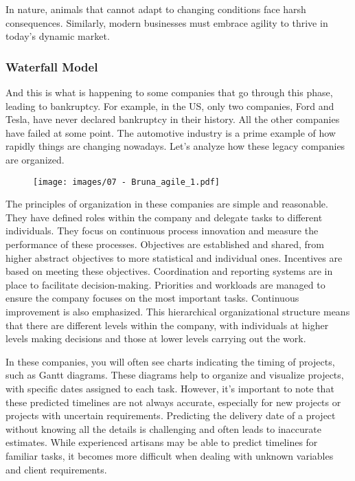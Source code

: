 In nature, animals that cannot adapt to changing conditions face harsh
consequences. Similarly, modern businesses must embrace agility to
thrive in today's dynamic market.

\subsubsection{Waterfall Model}

And this is what is happening to some companies that go through this
phase, leading to bankruptcy. For example, in the US, only two
companies, Ford and Tesla, have never declared bankruptcy in their
history. All the other companies have failed at some point. The
automotive industry is a prime example of how rapidly things are
changing nowadays. Let's analyze how these legacy companies are
organized.

\begin{figure}[!h]
    \centering
    \texttt{[image: images/07 - Bruna\_agile\_1.pdf]}
\end{figure}

The principles of organization in these companies are simple and
reasonable. They have defined roles within the company and delegate
tasks to different individuals. They focus on continuous process
innovation and measure the performance of these processes. Objectives
are established and shared, from higher abstract objectives to more
statistical and individual ones. Incentives are based on meeting these
objectives. Coordination and reporting systems are in place to
facilitate decision-making. Priorities and workloads are managed to
ensure the company focuses on the most important tasks. Continuous
improvement is also emphasized. This hierarchical organizational
structure means that there are different levels within the company, with
individuals at higher levels making decisions and those at lower levels
carrying out the work.

In these companies, you will often see charts indicating the timing of
projects, such as Gantt diagrams. These diagrams help to organize and
visualize projects, with specific dates assigned to each task. However,
it's important to note that these predicted timelines are not always
accurate, especially for new projects or projects with uncertain
requirements. Predicting the delivery date of a project without knowing
all the details is challenging and often leads to inaccurate estimates.
While experienced artisans may be able to predict timelines for familiar
tasks, it becomes more difficult when dealing with unknown variables and
client requirements.

